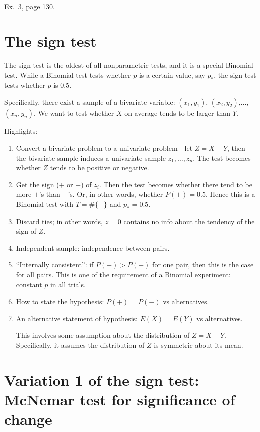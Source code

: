 \documentclass[12pt]{article}
\begin{document}
\example Ex.~3, page 130.

\section{The sign test}

The sign test is the oldest of all nonparametric tests,
and it is a special Binomial test. While a Binomial test tests whether
$p$ is a certain value, say $p_*$,
the sign test tests whether $p$ is 0.5.

Specifically,
there exist a sample of a bivariate variable:
$(x_1, y_1)$, $(x_2, y_2)$,..., $(x_n, y_n)$.
We want to test whether $X$ on average tends to be larger than $Y$.

Highlights:
\begin{enumerate}
\item Convert a bivariate problem to a univariate problem---let
    $Z = X - Y$, then the bivariate sample induces a univariate sample
    $z_1,\dotsc, z_n$.
    The test becomes whether $Z$ tends to be positive or negative.
\item Get the sign ($+$ or $-$) of $z_i$.
    Then the test becomes whether there tend to be more $+$'s than
    $-$'s. Or, in other words, whether $P(+) = 0.5$.
    Hence this is a Binomial test with $T = \#\{+\}$ and $p_* = 0.5$.
\item Discard ties; in other words, $z=0$ contains no info about the
    tendency of the sign of $Z$.
\item Independent sample: independence between pairs.
\item ``Internally consistent'': if $P(+) > P(-)$ for one pair, then
    this is the case for all pairs.
    This is one of the requirement of a Binomial experiment: constant
    $p$ in all trials.
\item How to state the hypothesis: $P(+) = P(-)$ vs alternatives.
\item An alternative statement of hypothesis: $E(X) = E(Y)$ vs
    alternatives.

    This involves some assumption about the distribution of $Z = X - Y$.
    Specifically, it assumes the distribution of $Z$ is symmetric about
    its mean.
\end{enumerate}


\section{Variation 1 of the sign test: McNemar test for significance of
change}
\end{document}
